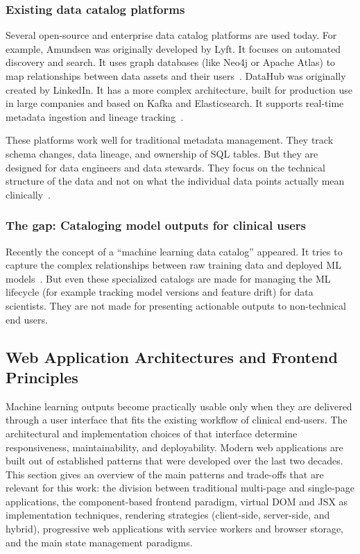 \subsubsection{Existing data catalog platforms}
Several open-source and enterprise data catalog platforms are used today. For example, Amundsen was originally developed by Lyft. It focuses on automated discovery and search. It uses graph databases (like Neo4j or Apache Atlas) to map relationships between data assets and their users~\cite{automated_catalogs_2025}. DataHub was originally created by LinkedIn. It has a more complex architecture, built for production use in large companies and based on Kafka and Elasticsearch. It supports real-time metadata ingestion and lineage tracking~\cite{atlan_amundsen_datahub_2025}.

These platforms work well for traditional metadata management. They track schema changes, data lineage, and ownership of SQL tables. But they are designed for data engineers and data stewards. They focus on the technical structure of the data and not on what the individual data points actually mean clinically~\cite{matillion_catalog_2024}.

\subsubsection{The gap: Cataloging model outputs for clinical users}
Recently the concept of a ``machine learning data catalog'' appeared. It tries to capture the complex relationships between raw training data and deployed ML models~\cite{murdio_ml_catalog_2026}. But even these specialized catalogs are made for managing the ML lifecycle (for example tracking model versions and feature drift) for data scientists. They are not made for presenting actionable outputs to non-technical end users.

\subsection{Web Application Architectures and Frontend Principles}
\label{sec:web_arch_frontend}

Machine learning outputs become practically usable only when they are delivered through a user interface that fits the existing workflow of clinical end-users. The architectural and implementation choices of that interface determine responsiveness, maintainability, and deployability. Modern web applications are built out of established patterns that were developed over the last two decades. This section gives an overview of the main patterns and trade-offs that are relevant for this work: the division between traditional multi-page and single-page applications, the component-based frontend paradigm, virtual DOM and JSX as implementation techniques, rendering strategies (client-side, server-side, and hybrid), progressive web applications with service workers and browser storage, and the main state management paradigms.

